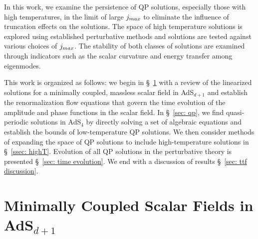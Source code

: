\documentclass[../PhD.tex]{subfiles}
\begin{document}
In this work, we examine the persistence of QP solutions, especially those with high temperatures, in the limit of large $j_{max}$ to eliminate the influence of truncation effects on the solutions. The space of high temperature solutions is explored using established perturbative methods and solutions are tested against various choices of $j_{max}$. The stability of both classes of solutions are examined through indicators such as the scalar curvature and energy transfer among eigenmodes. 

This work is organized as follows: we begin in \S~\!\ref{sec: scalar in AdS} with a review of the linearized solutions for a minimally coupled, massless scalar field in AdS$_{d+1}$ and establish the renormalization flow equations that govern the time evolution of the amplitude and phase functions in the scalar field. In \S~\!\ref{sec: qp}, we find quasi-periodic solutions in AdS$_4$ by directly solving a set of algebraic equations and establish the bounds of low-temperature QP solutions. We then consider methods of expanding the space of QP solutions to include high-temperature solutions in \S\!~\ref{ssec: highT}. Evolution of all QP solutions in the perturbative theory is presented \S\!~\ref{sec: time evolution}. We end with a discussion of results \S~\!\ref{sec: ttf discussion}. 


\section{Minimally Coupled Scalar Fields in AdS$_{d+1}$}
\label{sec: scalar in AdS}
\end{document}
